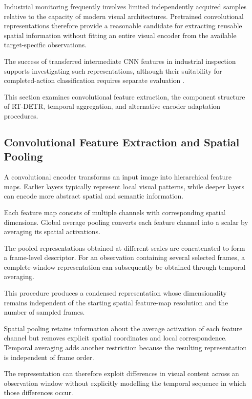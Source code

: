 Industrial monitoring frequently involves limited independently acquired samples relative to the capacity of modern visual architectures. Pretrained convolutional representations therefore provide a reasonable candidate for extracting reusable spatial information without fitting an entire visual encoder from the available target-specific observations.

The success of transferred intermediate CNN features in industrial inspection supports investigating such representations, although their suitability for completed-action classification requires separate evaluation \parencite{Roth2022Towards}.

This section examines convolutional feature extraction, the component structure of RT-DETR, temporal aggregation, and alternative encoder adaptation procedures.

\subsection{Convolutional Feature Extraction and Spatial Pooling}

A convolutional encoder transforms an input image into hierarchical feature maps. Earlier layers typically represent local visual patterns, while deeper layers can encode more abstract spatial and semantic information.

Each feature map consists of multiple channels with corresponding spatial dimensions. Global average pooling converts each feature channel into a scalar by averaging its spatial activations.

The pooled representations obtained at different scales are concatenated to form a frame-level descriptor. For an observation containing several selected frames, a complete-window representation can subsequently be obtained through temporal averaging.

This procedure produces a condensed representation whose dimensionality remains independent of the starting spatial feature-map resolution and the number of sampled frames.

Spatial pooling retains information about the average activation of each feature channel but removes explicit spatial coordinates and local correspondence. Temporal averaging adds another restriction because the resulting representation is independent of frame order.

The representation can therefore exploit differences in visual content across an observation window without explicitly modelling the temporal sequence in which those differences occur.

